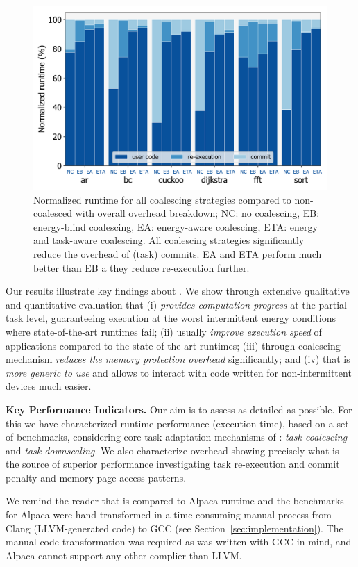 \begin{figure}
	\centering
	\includegraphics[width=0.5\columnwidth]{figures/coalEfficiency}
	\caption{Normalized \sys runtime for all coalescing strategies compared to non-coalesced \sys with overall \sys overhead breakdown; NC: no coalescing, EB: energy-blind coalescing, EA: energy-aware coalescing, ETA: energy and task-aware coalescing. All \sys coalescing strategies significantly reduce the overhead of (task) commits. EA and ETA perform much better than EB a they reduce re-execution further.}
	\label{fig:overallOverheadBreakdown}
\end{figure}

Our results illustrate key findings about \sys. We show through extensive qualitative and quantitative evaluation that (i) \sys \emph{provides computation progress} at the partial task level, guaranteeing execution at the worst intermittent energy conditions where state-of-the-art runtimes fail; (ii) usually \emph{improve execution speed} of applications compared to the state-of-the-art runtimes; (iii) \sys through coalescing mechanism \emph{reduces the memory protection overhead} significantly; and (iv) that \sys is \emph{more generic to use} and allows to interact with code written for non-intermittent devices much easier. 

\textbf{Key Performance Indicators.} Our aim is to assess \sys as detailed as possible. For this we have characterized \sys runtime performance (execution time), based on a set of benchmarks, considering core task adaptation mechanisms of \sys: \emph{task coalescing} and \emph{task downscaling}. We also characterize \sys overhead showing precisely what is the source of \sys superior performance investigating task re-execution and commit penalty and memory page access patterns.

We remind the reader that \sys is compared to Alpaca runtime and the benchmarks for Alpaca were hand-transformed in a time-consuming manual process from Clang (LLVM-generated code) to GCC (see Section~\ref{sec:implementation}). The manual code transformation was required as \sys was written with GCC in mind, and Alpaca cannot support any other complier than LLVM.

